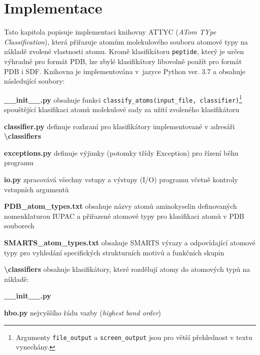\chapter{Implementace}
Tato kapitola popisuje implementaci knihovny ATTYC (\textit{ATom TYpe Classification}), která přiřazuje atomům molekulového souboru atomové typy na základě zvolené vlastnosti atomu. Kromě klasifikátoru \verb|peptide|, který je určen výhradně pro formát PDB, lze zbylé klasifikátory libovolně použít pro formát PDB i SDF. Knihovna je implementována v~jazyce Python ver. 3.7 a obsahuje následující soubory:

\vspace{0.4cm}
\noindent {} \textbf{\_\_init\_\_.py} obsahuje funkci \verb|classify_atoms(input_file, classifier)|\footnote{Argumenty \texttt{file\_output} a \texttt{screen\_output} jsou pro větší přehlednost v textu vynechány.}
spouštějící klasifikaci atomů molekulové sady za uži\-tí zvoleného klasifikátoru

\medskip
\noindent \textbf{classifier.py} definuje rozhraní pro klasifikátory implementované v adresáři \textbf{\textbackslash classifiers}

\medskip
\noindent \textbf{exceptions.py} definuje výjimky (potomky třídy Exception) pro řízení běhu programu

\medskip
\noindent {}\textbf{io.py} zpracovává všechny vstupy a výstupy (I/O) programu včetně kontroly vstupních argumentů 

\medskip
\noindent {}\textbf{PDB\_atom\_types.txt} obsahuje názvy atomů aminokyselin definovaných nomenklaturou IUPAC a přiřazené atomové typy pro klasifikaci atomů v PDB souborech

\medskip
\noindent {}\textbf{SMARTS\_atom\_types.txt} obsahuje SMARTS výrazy a odpovídající atomové typy pro vyhledání specifických strukturních motivů a funkčních skupin 

\medskip
\noindent\textbf{\textbackslash classifiers} obsahuje klasifikátory, které rozdělují atomy do atomových typů na základě:

\medskip
\textbf{\_\_init\_\_.py}

\vspace{0.01cm}
\textbf{hbo.py} nejvyššího řádu vazby (\textit{highest bond order})

